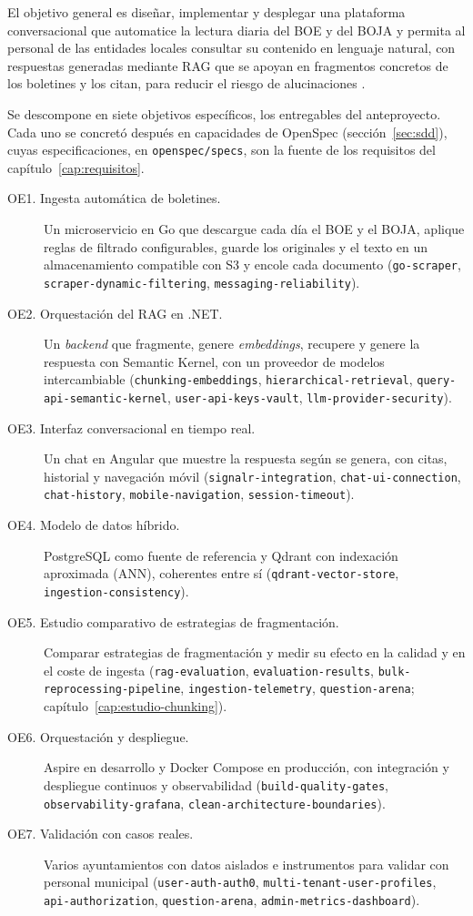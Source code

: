 El objetivo general es diseñar, implementar y desplegar una plataforma conversacional que automatice la lectura diaria del BOE y del BOJA y permita al personal de las entidades locales consultar su contenido en lenguaje natural, con respuestas generadas mediante RAG \cite{lewis2020} que se apoyan en fragmentos concretos de los boletines y los citan, para reducir el riesgo de alucinaciones \cite{huang2023}.

Se descompone en siete objetivos específicos, los entregables del anteproyecto. Cada uno se concretó después en capacidades de OpenSpec (sección~\ref{sec:sdd}), cuyas especificaciones, en \texttt{openspec/specs}, son la fuente de los requisitos del capítulo~\ref{cap:requisitos}.

{\sloppy
\begin{description}
  \item[OE1. Ingesta automática de boletines.] Un microservicio en Go que descargue cada día el BOE y el BOJA, aplique reglas de filtrado configurables, guarde los originales y el texto en un almacenamiento compatible con S3 y encole cada documento (\texttt{go-scraper}, \texttt{scraper-dynamic-filtering}, \texttt{messaging-reliability}).
  \item[OE2. Orquestación del RAG en .NET.] Un \emph{backend} que fragmente, genere \emph{embeddings}, recupere y genere la respuesta con Semantic Kernel, con un proveedor de modelos intercambiable (\texttt{chunking-embeddings}, \texttt{hierarchical-retrieval}, \texttt{query-api-semantic-kernel}, \texttt{user-api-keys-vault}, \texttt{llm-provider-security}).
  \item[OE3. Interfaz conversacional en tiempo real.] Un chat en Angular que muestre la respuesta según se genera, con citas, historial y navegación móvil (\texttt{signalr-integration}, \texttt{chat-ui-connection}, \texttt{chat-history}, \texttt{mobile-navigation}, \texttt{session-timeout}).
  \item[OE4. Modelo de datos híbrido.] PostgreSQL como fuente de referencia y Qdrant con indexación aproximada (ANN), coherentes entre sí (\texttt{qdrant-vector-store}, \texttt{ingestion-consistency}).
  \item[OE5. Estudio comparativo de estrategias de fragmentación.] Comparar estrategias de fragmentación y medir su efecto en la calidad y en el coste de ingesta (\texttt{rag-evaluation}, \texttt{evaluation-results}, \texttt{bulk-reprocessing-pipeline}, \texttt{ingestion-telemetry}, \texttt{question-arena}; capítulo~\ref{cap:estudio-chunking}).
  \item[OE6. Orquestación y despliegue.] Aspire en desarrollo y Docker Compose en producción, con integración y despliegue continuos y observabilidad (\texttt{build-quality-gates}, \texttt{observability-grafana}, \texttt{clean-architecture-boundaries}).
  \item[OE7. Validación con casos reales.] Varios ayuntamientos con datos aislados e instrumentos para validar con personal municipal (\texttt{user-auth-auth0}, \texttt{multi-tenant-user-profiles}, \texttt{api-authorization}, \texttt{question-arena}, \texttt{admin-metrics-dashboard}).
\end{description}
\par}

